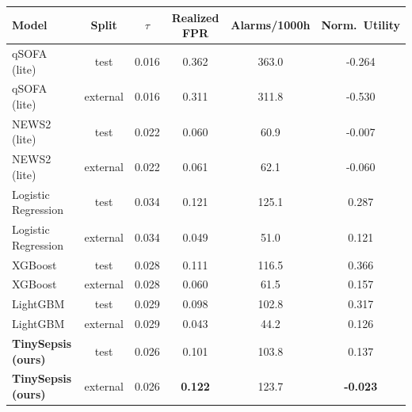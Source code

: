 \begin{tabular}{lccccc}
\toprule
Model & Split & $\tau$ & Realized FPR & Alarms/1000h & Norm.\ Utility \\
\midrule
qSOFA (lite) & test & 0.016 & 0.362 & 363.0 & -0.264 \\
qSOFA (lite) & external & 0.016 & 0.311 & 311.8 & -0.530 \\
NEWS2 (lite) & test & 0.022 & 0.060 & 60.9 & -0.007 \\
NEWS2 (lite) & external & 0.022 & 0.061 & 62.1 & -0.060 \\
Logistic Regression & test & 0.034 & 0.121 & 125.1 & 0.287 \\
Logistic Regression & external & 0.034 & 0.049 & 51.0 & 0.121 \\
XGBoost & test & 0.028 & 0.111 & 116.5 & 0.366 \\
XGBoost & external & 0.028 & 0.060 & 61.5 & 0.157 \\
LightGBM & test & 0.029 & 0.098 & 102.8 & 0.317 \\
LightGBM & external & 0.029 & 0.043 & 44.2 & 0.126 \\
\textbf{TinySepsis (ours)} & test & 0.026 & 0.101 & 103.8 & 0.137 \\
\textbf{TinySepsis (ours)} & external & 0.026 & \textbf{0.122} & 123.7 & \textbf{-0.023} \\
\bottomrule
\end{tabular}
